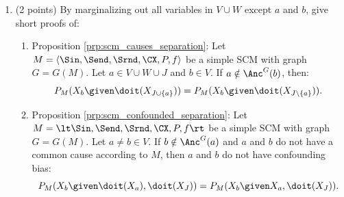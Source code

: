\begin{enumerate}
\begin{ungradedsolution}
\begin{enumerate}
			Now, let $M$ and $\tilde{M}$ be counterfactually equivalent with respect to $O$. Then, by definition, the SCMs $M^\twin$ and $\tilde{M}^\twin$ are interventionally equivalent with respect to $O\cup O'$. By Corollary \ref*{Cor:various_equiv_marginalization}, the SCMs $M^\twin_{\setminus V'}$ and $\tilde{M}^\twin_{\setminus \tilde{V}'}$ are interventionally equivalent with respect to $O$. By the above argument, the former and the latter are respectively interventionally equivalent to $M$ and $\tilde{M}$ with respect to $O$. By transitivity of interventional equivalence, we conclude that $M$ and $\tilde{M}$ are interventionally equivalent with respect to $O$.


			\item That $M$ and $\tilde{M}$ are interventionally equivalent with respect to $O$ means that, for all $T \subseteq O$, $M_{\text{do}(T)}$ is observationally equivalent to $\tilde{M}_{\text{do}(T)}$ with respect to $O \setminus T$.
			Setting $T = \emptyset$ implies that $M$ and $\tilde{M}$ are observationally equivalent with respect to $O$.
		\end{enumerate}
	\end{ungradedsolution}

	\item (2 points) By marginalizing out all variables in $V \cup W$ except $a$ and $b$, give short proofs of:
	\begin{enumerate}
		\item Proposition \ref*{prp:scm_causes_separation}: Let $M = \langle \Sin, \Send, \Srnd, \CX, P, f \rangle$ be a simple SCM with graph $G = G(M)$.
		Let $a \in V \cup W \cup J$ and $b \in V$.
		If $a \notin \Anc^G(b)$, then:
		$$P_{M}(X_b \given \doit(X_{J\cup \{a\}})) = P_{M}(X_b \given \doit(X_{J\setminus \{a\}})).$$
		\item Proposition \ref*{prp:scm_confounded_separation}:  Let $M = \lt \Sin, \Send, \Srnd, \CX, P, f \rt$ be a simple SCM with graph $G = G(M)$.
		Let $a \ne b \in V$.
		If $b \notin \Anc^G(a)$ and $a$ and $b$ do not have a common cause according to $M$, then
		$a$ and $b$ do not have confounding bias:
		$$P_{M}(X_b \given \doit(X_a), \doit(X_J)) = P_{M}(X_b \given X_a, \doit(X_J)).$$
	\end{enumerate}


\end{enumerate}
